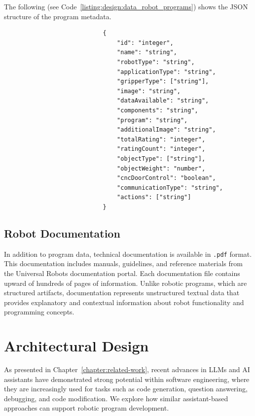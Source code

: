 The following (see Code~\ref{listing:design:data_robot_programs}) shows the JSON structure of the program metadata.
\begin{listing}[h]
    \begin{verbatim}
                            {
                                "id": "integer",
                                "name": "string",
                                "robotType": "string",
                                "applicationType": "string",
                                "gripperType": ["string"],
                                "image": "string",
                                "dataAvailable": "string",
                                "components": "string",
                                "program": "string",
                                "additionalImage": "string",
                                "totalRating": "integer",
                                "ratingCount": "integer",
                                "objectType": ["string"],
                                "objectWeight": "number",
                                "cncDoorControl": "boolean",
                                "communicationType": "string",
                                "actions": ["string"]
                            }
    \end{verbatim}
    \caption{JSON structure of robotic program metadata.}
    \label{listing:design:data_robot_programs}
\end{listing}

\subsection{Robot Documentation}
In addition to program data, technical documentation is available in \texttt{.pdf} format. This documentation includes manuals, guidelines, and reference materials from the Universal Robots documentation portal. \cite{UniversalRobots2026Downloads} Each documentation file contains upward of hundreds of pages of information. Unlike robotic programs, which are structured artifacts, documentation represents unstructured textual data that provides explanatory and contextual information about robot functionality and programming concepts.


\newpage
\section{Architectural Design}
As presented in Chapter~\ref{chapter:related-work}, recent advances in LLMs and AI assistants have demonstrated strong potential within software engineering, where they are increasingly used for tasks such as code generation, question answering, debugging, and code modification. We explore how similar assistant-based approaches can support robotic program development.

